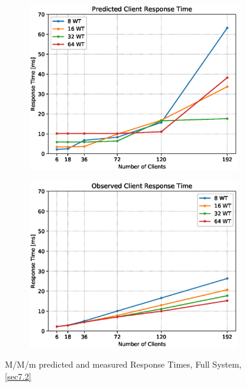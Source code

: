 \documentclass[11pt,a4paper]{article}
\begin{document}
\begin{figure}
    \begin{subfigure}{.5\textwidth}
        \includegraphics[width=1\linewidth]{plots/7_MMm_ResponseTimePredicted.eps}
    \end{subfigure}
    \begin{subfigure}{.5\textwidth}
        \includegraphics[width=1\linewidth]{plots/7_MMm_ResponseTimeObserved.eps}
    \end{subfigure}
    \caption{M/M/m predicted and measured Response Times, Full System, \autoref{sec7.2}}
    \label{fig:mmm-RT}
\end{figure}
\end{document}
